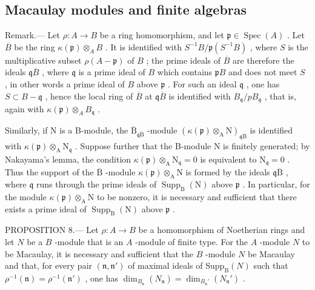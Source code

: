 \subsection{Macaulay modules and finite algebras}

Remark.--- Let \(\rho: A \to B\) be a ring homomorphism, and let \(\mathfrak{p} \in \operatorname{Spec}(A)\) . Let \(\overline{B}\) be the ring \(\kappa(\mathfrak{p}) \otimes_{A} B\) . It is identified with \(S^{-1}B/\mathfrak{p}(S^{-1}B)\) , where \(S\) is the multiplicative subset \(\rho(A - \mathfrak{p})\) of \(B\) ; the prime ideals of \(\overline{B}\) are therefore the ideals \(\mathfrak{q}\overline{B}\) , where \(\mathfrak{q}\) is a prime ideal of \(B\) which contains \(\mathfrak{p}B\) and does not meet \(S\) , in other words a prime ideal of \(B\) above \(\mathfrak{p}\) . For such an ideal \(\mathfrak{q}\) , one has \(S \subset B - \mathfrak{q}\) , hence the local ring of \(\overline{B}\) at \(\mathfrak{q}\overline{B}\) is identified with \(B_{\mathfrak{q}}/pB_{\mathfrak{q}}\) , that is, again with \(\kappa(\mathfrak{p}) \otimes_{A} B_{\mathfrak{q}}\) .

Similarly, if N is a B-module, the \(\overline{\mathrm{B}}_{\mathfrak{q}\overline{\mathrm{B}}}\) -module \(\left(\kappa(\mathfrak{p})\otimes_{\mathrm{A}}\mathrm{N}\right)_{\mathfrak{q}\overline{\mathrm{B}}}\) is identified with \(\kappa(\mathfrak{p})\otimes_{\mathrm{A}}\mathrm{N}_{\mathfrak{q}}\) . Suppose further that the B-module N is finitely generated; by Nakayama's lemma, the condition \(\kappa(\mathfrak{p})\otimes_{\mathrm{A}}\mathrm{N}_{\mathfrak{q}}=0\) is equivalent to \(\mathrm{N}_{\mathfrak{q}}=0\) . Thus the support of the \(\overline{\mathrm{B}}\) -module \(\kappa(\mathfrak{p})\otimes_{\mathrm{A}}\mathrm{N}\) is formed by the ideals \(\mathfrak{q}\overline{\mathrm{B}}\) , where \(\mathfrak{q}\) runs through the prime ideals of \(\operatorname{Supp}_{\mathrm{B}}(\mathrm{N})\) above \(\mathfrak{p}\) . In particular, for the module \(\kappa(\mathfrak{p})\otimes_{\mathrm{A}}\mathrm{N}\) to be nonzero, it is necessary and sufficient that there exists a prime ideal of \(\operatorname{Supp}_{\mathrm{B}}(\mathrm{N})\) above \(\mathfrak{p}\) .

PROPOSITION 8.--- Let \(\rho: A \to B\) be a homomorphism of Noetherian rings and let \(N\) be a \(B\) -module that is an \(A\) -module of finite type. For the \(A\) -module \(N\) to be Macaulay, it is necessary and sufficient that the \(B\) -module \(N\) be Macaulay and that, for every pair \((\mathfrak{n}, \mathfrak{n}')\) of maximal ideals of \(\mathrm{Supp}_{\mathrm{B}}(N)\) such that \(\rho^{-1}(\mathfrak{n}) = \rho^{-1}(\mathfrak{n}')\) , one has \(\dim_{B_{\mathfrak{n}}} (N_{\mathfrak{n}}) = \dim_{B_{\mathfrak{n}}'} (N_{\mathfrak{n}}')\) .

